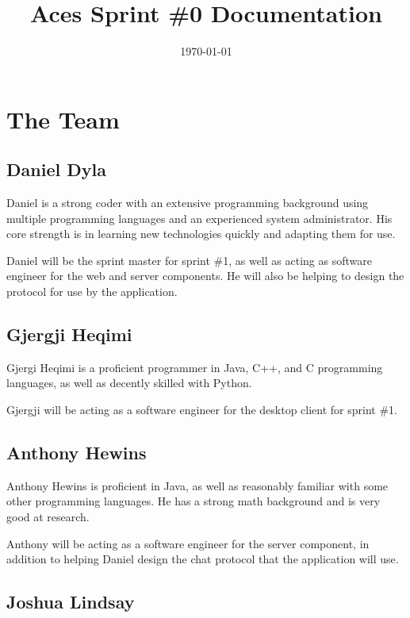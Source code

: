 \documentclass[11pt]{article}
\date{\today}
\title{Aces Sprint \#0 Documentation}
\begin{document}
\maketitle
\tableofcontents


\section{The Team}
\label{sec-1}

\subsection{Daniel Dyla}
\label{sec-1-1}

Daniel is a strong coder with an extensive programming background
using multiple programming languages and an experienced system
administrator. His core strength is in learning new technologies
quickly and adapting them for use.

Daniel will be the sprint master for sprint \#1, as well as acting as
software engineer for the web and server components. He will also be
helping to design the protocol for use by the application.

\subsection{Gjergji Heqimi}
\label{sec-1-2}

Gjergi Heqimi is a proficient programmer in Java, C++, and C
programming languages, as well as decently skilled with Python.

Gjergji will be acting as a software engineer for the desktop client
for sprint \#1.

\subsection{Anthony Hewins}
\label{sec-1-3}

Anthony Hewins is proficient in Java, as well as reasonably familiar
with some other programming languages. He has a strong math background
and is very good at research.

Anthony will be acting as a software engineer for the server
component, in addition to helping Daniel design the chat protocol that
the application will use.

\subsection{Joshua Lindsay}
\label{sec-1-4}
\end{document}
